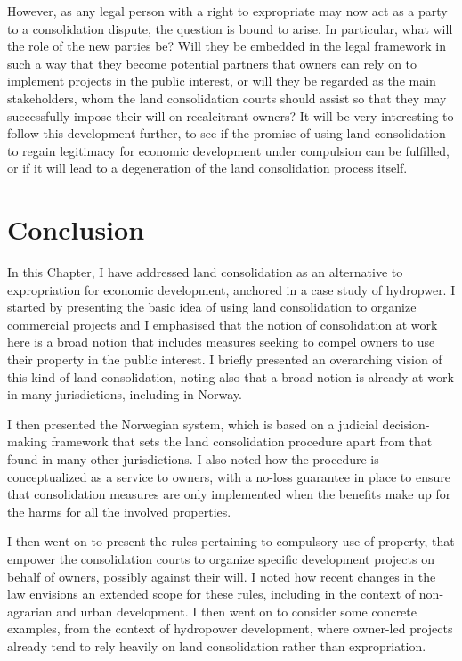 However, as any legal person with a right to expropriate may now act as a party to a consolidation dispute, the question is bound to arise. In particular, what will the role of the new parties be? Will they be embedded in the legal framework in such a way that they become potential partners that owners can rely on to implement projects in the public interest, or will they be regarded as the main stakeholders, whom the land consolidation courts should assist so that they may successfully impose their will on recalcitrant owners? It will be very interesting to follow this development further, to see if the promise of using land consolidation to regain legitimacy for economic development under compulsion can be fulfilled, or if it will lead to a degeneration of the land consolidation process itself.

\section{Conclusion}\label{sec:conc}

In this Chapter, I have addressed land consolidation as an alternative to expropriation for economic development, anchored in a case study of hydropwer. I started by presenting the basic idea of using land consolidation to organize commercial projects and I emphasised that the notion of consolidation at work here is a broad notion that includes measures seeking to compel owners to use their property in the public interest. I briefly presented an overarching vision of this kind of land consolidation, noting also that a broad notion is already at work in many jurisdictions, including in Norway. 

I then presented the Norwegian system, which is based on a judicial decision-making framework that sets the land consolidation procedure apart from that found in many other jurisdictions. I also noted how the procedure is conceptualized as a service to owners, with a no-loss guarantee in place to ensure that consolidation measures are only implemented when the benefits make up for the harms for all the involved properties.

I then went on to present the rules pertaining to compulsory use of property, that empower the consolidation courts to organize specific development projects on behalf of owners, possibly against their will. I noted how recent changes in the law envisions an extended scope for these rules, including in the context of non-agrarian and urban development. I then went on to consider some concrete examples, from the context of hydropower development, where owner-led projects already tend to rely heavily on land consolidation rather than expropriation. 

